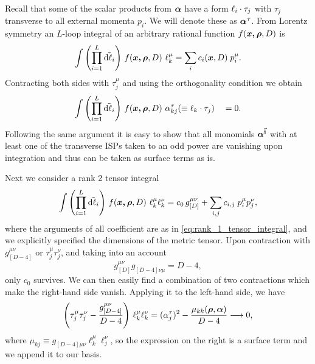 Recall that some of the scalar products from $\vb*{\alpha}$ have a form $\sp(\ell_i,\tau_j)$ with $\tau_j$ transverse to all external momenta $p_i$.
We will denote these as $\vb*{\alpha}^\tau$.
From Lorentz symmetry an $L$-loop integral of an arbitrary rational function $f(\vb*{\vb*{x},\vb*{\rho}},D)$ is
\begin{equation} \label{eq:rank_1_tensor_integral}
  \int \qty(\prod_{i=1}^{L} \tilde{\dd{\ell_i}}){}~ f(\vb*{\vb*{x},\vb*{\rho}},D) ~ \ell_k^{\mu} = \sum_{i}^{}c_i(\vb*{x},D)\;p^\mu_i.
\end{equation}
Contracting both sides with $\tau^\mu_j$ and using the orthogonality condition we obtain
\begin{equation}
  \Dmeasure{}~ f(\vb*{\vb*{x},\vb*{\rho}},D) ~ \alpha^{\tau}_{k j}( \equiv \sp(\ell_k,\tau_j)) \quad = 0.
\end{equation}
Following the same argument it is easy to show that all monomials $\vb*{\alpha}^{\va{i}}$ with at least
one of the transverse ISPs taken to an odd power are vanishing upon integration and thus can be taken as surface terms as is.

Next we consider a rank 2 tensor integral
\begin{equation}
  \int \qty(\prod_{i=1}^{L} \tilde{\dd{\ell_i}}){}~ f(\vb*{\vb*{x},\vb*{\rho}},D) ~ \ell_k^{\mu}\ell_k^{\nu} = c_0\,g^{\mu\nu}_{[D]} + \sum_{i,j}^{}c_{i,j}\;p^\mu_i p^\nu_j,
\end{equation}
where the arguments of all coefficient are as in \cref{eq:rank_1_tensor_integral}, and we explicitly specified the dimensions of the metric tensor.
Upon contraction with $g^{\mu\nu}_{[D-4]}$ or $\tau_j^\mu\tau_j^\nu$, and taking into an account
\[
  g^{\mu\nu}_{[D]}g^{\phantom{\mu\nu}}_{[D-4]\nu\mu} = D-4,
\]
only $c_0$ survives.
We can then easily find a combination of two contractions which make the right-hand side vanish. Applying it to the left-hand side, we have
\begin{equation}
  \qty(\tau_j^\mu\tau_j^\nu - \frac{g^{\mu\nu}_{[D-4]}}{D-4}) ~ \ell_k^{\mu}\ell_k^{\nu} = (\alpha_j^\tau)^2 - \frac{\mu_{kk}(\vb*{\rho},\vb*{\alpha})}{D-4} \longrightarrow 0,
\end{equation}
where $\mu_{kj} \equiv g^{\phantom{\mu\nu}}_{[D-4]\mu\nu} \ell_k^\mu \ell_j^\nu$, so the expression on the right is a surface term and
we append it to our basis.

